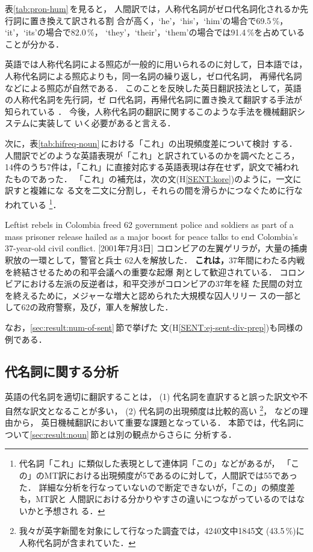 表\ref{tab:pron-hum}\,を見ると，
人間訳では，人称代名詞がゼロ代名詞化されるか先行詞に置き換えて訳される割
合が高く，`he'，`his'，`him'の場合で69.5\,\%，
`it'，`its'の場合で82.0\,\%，
`they'，`their'，`them'の場合では91.4\,\%を占めていることが分かる．

英語では人称代名詞による照応が一般的に用いられるのに対して，日本語では，
人称代名詞による照応よりも，同一名詞の繰り返し，ゼロ代名詞，
再帰代名詞などによる照応が自然である\cite{Kanzaki94}．
このことを反映した英日翻訳技法として，英語の人称代名詞を先行詞，ゼ
ロ代名詞，再帰代名詞に置き換えて翻訳する手法が知られている
\cite{Umegaki75,Nakamura82}．
今後，人称代名詞の翻訳に関するこのような手法を機械翻訳システムに実装して
いく必要があると言える．

次に，表\ref{tab:hifreq-noun}\,における「これ」の出現頻度差について検討
する． 
人間訳でどのような英語表現が「これ」と訳されているのかを調べたところ，
14件のうち7件は，「これ」に直接対応する英語表現は存在せず，訳文で補われ
たものであった．
「これ」の補充は，次の文(H\ref{SENT:kore})のように，一文に訳すと複雑にな
る文を二文に分割し，それらの間を滑らかにつなぐために行なわれている
\footnote{代名詞「これ」に類似した表現として連体詞「この」などがあるが，
「この」のMT訳における出現頻度が5であるのに対して，人間訳では55であった．
詳細な分析を行なっていないので断定できないが，「この」の頻度差も，MT訳と 
人間訳における分かりやすさの違いにつながっているのではないかと予想され
る．}．
\begin{SENT2}
\sentE Leftist rebels in Colombia freed 62 government police and 
soldiers as part of a mass prisoner release hailed as a major boost for 
peace talks to end Colombia's 37-year-old civil conflict. [2001年7月3日]
\sentH コロンビアの左翼ゲリラが，大量の捕虜釈放の一環として，警官と兵士
62人を解放した．
{\bf これは，}37年間にわたる内戦を終結させるための和平会議への重要な起爆
剤として歓迎されている．
\sentM コロンビアにおける左派の反逆者は，和平交渉がコロンビアの37年を経
た民間の対立を終えるために，メジャーな増大と認められた大規模な囚人リリー
スの一部として62の政府警察，及び，軍人を解放した．
\label{SENT:kore}
\end{SENT2}
なお，\ref{sec:result:num-of-sent}\,節で挙げた
文(H\ref{SENT:ej-sent-div-prep})も同様の例である．


\subsection{代名詞に関する分析}
\label{sec:result:pron}

英語の代名詞を適切に翻訳することは，
(1) 代名詞を直訳すると誤った訳文や不自然な訳文となることが多い，
(2) 代名詞の出現頻度は比較的高い
\footnote{我々が英字新聞を対象にして行なった調査では，4240文中1845文
(43.5\,\%)に人称代名詞が含まれていた．}，
などの理由から，
英日機械翻訳において重要な課題となっている\cite{Yoshimi01a}．
本節では，代名詞について\ref{sec:result:noun}\,節とは別の観点からさらに
分析する．


